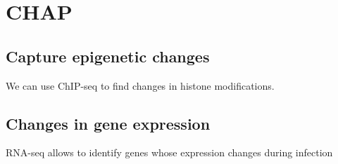 
\chapter{CHAP} %

\label{ch:04-02} %


\section{Capture epigenetic changes}
We can use ChIP-seq to find changes in histone modifications.
\section{Changes in gene expression}
RNA-seq allows to identify genes whose expression changes during infection
